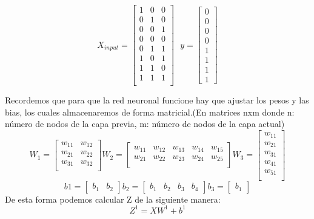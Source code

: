 \documentclass{article}
\begin{document}
	\[
	X_{input} = \begin{bmatrix}
		1 & 0 & 0 \\
		0 & 1 & 0 \\
		0 & 0 & 1 \\
		0 & 0 & 0 \\
		0 & 1 & 1 \\
		1 & 0 & 1 \\
		1 & 1 & 0 \\
		1 & 1 & 1 \\
	\end{bmatrix}
	\text{  }
	y = \begin{bmatrix}
		0 \\ 0 \\ 0 \\ 0 \\ 1 \\ 1 \\ 1 \\ 1
	\end{bmatrix}
	\]

Recordemos que para que la red neuronal funcione hay que ajustar los pesos y las bias, los cuales almacenaremos de forma matricial.(En matrices nxm donde n: número de nodos de la capa previa, m: número de nodos de la capa actual)
	\[
	W_1  = \begin{bmatrix}
		w_{11} & w_{12}\\
		w_{21} & w_{22}\\
		w_{31} & w_{32} \\
		\end{bmatrix}
	W_2  = \begin{bmatrix}
		w_{11} & w_{12} & w_{13} & w_{14} & w_{15}\\
		w_{21} & w_{22} & w_{23} & w_{24} & w_{25}\\
	\end{bmatrix}
	W_3  = \begin{bmatrix}
	w_{11} \\ w_{21} \\ w_{31} \\ w_{41} \\ w_{51} \\
	\end{bmatrix}
	\]
	\[
	b1 = \begin{bmatrix}
		b_1 & b_2
	\end{bmatrix}
	b_2 = \begin{bmatrix}
		b_1 & b_2 & b_3 & b_4
	\end{bmatrix}
	b_3 = \begin{bmatrix}
		b_1
	\end{bmatrix}
	\]
	De esta forma podemos calcular Z de la siguiente manera:
	\[
	Z^1 = XW^1 + b^1
	\]
\end{document}
